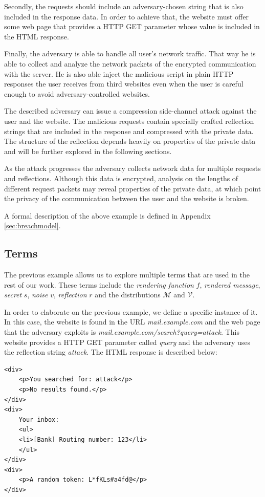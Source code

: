 \documentclass[conference, letterpaper, 10pt]{IEEEtran}
\begin{document}
Secondly, the requests should include an adversary-chosen string that is also
included in the response data. In order to achieve that, the website must offer
some web page that provides a HTTP GET parameter whose value is included in the HTML
response.

Finally, the adversary is able to handle all user's network traffic. That way he
is able to collect and analyze the network packets of the encrypted
communication with the server. He is also able inject the malicious script in
plain HTTP responses the user receives from third websites even when the user is
careful enough to avoid adversary-controlled websites.

The described adversary can issue a compression side-channel attack against the
user and the website. The malicious requests contain specially crafted
reflection strings that are included in the response and compressed with the
private data. The structure of the reflection depends heavily on properties of
the private data and will be further explored in the following sections.

As the attack progresses the adversary collects network data for multiple
requests and reflections. Although this data is encrypted, analysis on the
lengths of different request packets may reveal properties of the private data,
at which point the privacy of the communication between the user and the website is
broken.

A formal description of the above example is defined in Appendix \ref{sec:breachmodel}.

\subsection{Terms}
The previous example allows us to explore multiple terms that are used in the
rest of our work. These terms include the \textit{rendering function} $f$,
\textit{rendered message}, \textit{secret} $s$, \textit{noise} $v$,
\textit{reflection} $r$ and the distributions $\mathcal{M}$ and $\mathcal{V}$.

In order to elaborate on the previous example, we define a specific instance of
it. In this case, the website is found in the URL \textit{mail.example.com} and
the web page that the adversary exploits is
\textit{mail.example.com/search?query=attack}. This website provides a HTTP GET
parameter called \textit{query} and the adversary uses the reflection string
\textit{attack}. The HTML response is described below:

\begin{lstlisting}
<div>
    <p>You searched for: attack</p>
    <p>No results found.</p>
</div>
<div>
    Your inbox:
    <ul>
    <li>[Bank] Routing number: 123</li>
    </ul>
</div>
<div>
    <p>A random token: L*fKLs#a4fd@</p>
</div>
\end{lstlisting}
\end{document}
